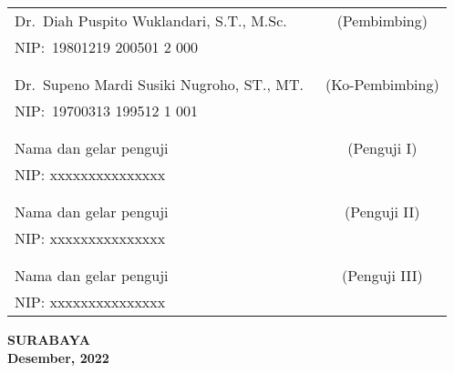    \noindent
    \begin{tabularx}{\textwidth}{X c}
      Dr.\ Diah Puspito Wuklandari, S.T., M.Sc.          & (Pembimbing) \\
      NIP:\ 19801219 200501 2 000        & \\
      &  \\
      &  \\
      Dr.\ Supeno Mardi Susiki Nugroho, ST., MT.\     & (Ko-Pembimbing) \\
      NIP:\ 19700313 199512 1 001        & \\
      &  \\
      &  \\
      Nama dan gelar penguji  & (Penguji I) \\
      NIP: xxxxxxxxxxxxxxx        & \\
      &  \\
      &  \\
      Nama dan gelar penguji  & (Penguji II) \\
      NIP: xxxxxxxxxxxxxxx        & \\
      &  \\
      &  \\
      Nama dan gelar penguji             & (Penguji III) \\
      NIP: xxxxxxxxxxxxxxx        & \\
    \end{tabularx}
  \endgroup

  \vspace{4ex}

  \begin{center}
    \textbf{SURABAYA} \\
    \textbf{Desember, 2022}
  \end{center}
\endgroup
